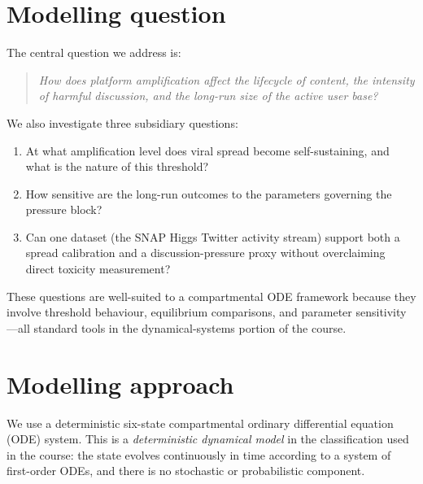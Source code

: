 \documentclass[11pt]{article}
\begin{document}
\section{Modelling question}
\label{sec:question}

The central question we address is:
\begin{quote}
\emph{How does platform amplification affect the lifecycle of content, the intensity of harmful discussion, and the long-run size of the active user base?}
\end{quote}

We also investigate three subsidiary questions:
\begin{enumerate}[leftmargin=1.5em]
    \item At what amplification level does viral spread become self-sustaining, and what is the nature of this threshold?
    \item How sensitive are the long-run outcomes to the parameters governing the pressure block?
    \item Can one dataset (the SNAP Higgs Twitter activity stream) support both a spread calibration and a discussion-pressure proxy without overclaiming direct toxicity measurement?
\end{enumerate}

These questions are well-suited to a compartmental ODE framework because they involve threshold behaviour, equilibrium comparisons, and parameter sensitivity---all standard tools in the dynamical-systems portion of the course.


\section{Modelling approach}
\label{sec:approach}

We use a deterministic six-state compartmental ordinary differential equation (ODE) system. This is a \emph{deterministic dynamical model} in the classification used in the course: the state evolves continuously in time according to a system of first-order ODEs, and there is no stochastic or probabilistic component.
\end{document}
